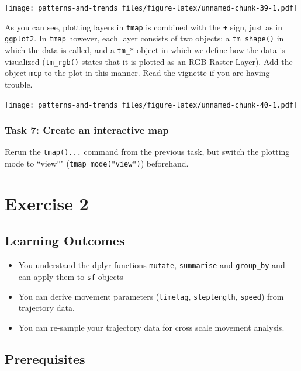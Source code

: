 \documentclass[]{book}
\providecommand{\tightlist}{%
  \setlength{\itemsep}{0pt}\setlength{\parskip}{0pt}}
\begin{document}
\texttt{[image: patterns-and-trends\_files/figure-latex/unnamed-chunk-39-1.pdf]}

As you can see, plotting layers in \texttt{tmap} is combined with the
\texttt{+} sign, just as in \texttt{ggplot2}. In \texttt{tmap} however,
each layer consists of two objects: a \texttt{tm\_shape()} in which the
data is called, and a \texttt{tm\_*} object in which we define how the
data is visualized (\texttt{tm\_rgb()} states that it is plotted as an
RGB Raster Layer). Add the object \texttt{mcp} to the plot in this
manner. Read
\href{https://cran.r-project.org/web/packages/tmap/vignettes/tmap-getstarted.html}{the
vignette} if you are having trouble.

\texttt{[image: patterns-and-trends\_files/figure-latex/unnamed-chunk-40-1.pdf]}

\subsection{Task 7: Create an interactive
map}\label{task-7-create-an-interactive-map}

Rerun the \texttt{tmap()...} command from the previous task, but switch
the plotting mode to ``view''" (\texttt{tmap\_mode("view")}) beforehand.

\chapter{Exercise 2}\label{exercise-2}

\section{Learning Outcomes}\label{learning-outcomes}

\begin{itemize}
\tightlist
\item
  You understand the dplyr functions \texttt{mutate}, \texttt{summarise}
  and \texttt{group\_by} and can apply them to \texttt{sf} objects
\item
  You can derive movement parameters (\texttt{timelag},
  \texttt{steplength}, \texttt{speed}) from trajectory data.
\item
  You can re-sample your trajectory data for cross scale movement
  analysis.
\end{itemize}

\section{Prerequisites}\label{prerequisites-1}
\end{document}
